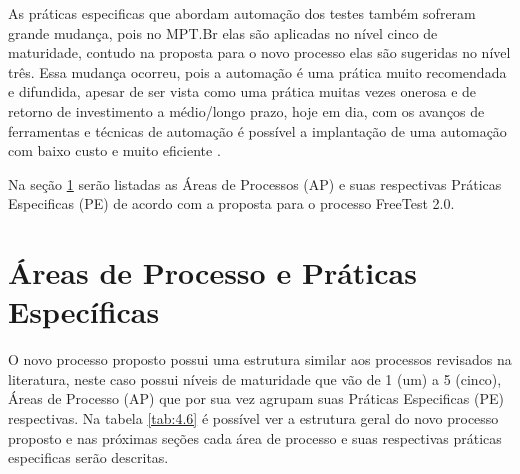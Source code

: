 As práticas especificas que abordam automação dos testes também sofreram grande mudança, pois no MPT.Br elas são aplicadas no nível cinco de maturidade, contudo na proposta para o novo processo elas são sugeridas no nível três. Essa mudança ocorreu, pois a automação é uma prática muito recomendada e difundida, apesar de ser vista como uma prática muitas vezes onerosa e de retorno de investimento a médio/longo prazo, hoje em dia, com os avanços de ferramentas e técnicas de automação é possível a implantação de uma automação com baixo custo e muito eficiente \cite{BRAGA2015}.

Na seção \ref{sec:areasdeprocessoepraticas} serão listadas as Áreas de Processos (AP) e suas respectivas Práticas Especificas (PE) de acordo com a proposta para o processo FreeTest 2.0.

\section{Áreas de Processo e Práticas Específicas}
\label{sec:areasdeprocessoepraticas}

O novo processo proposto possui uma estrutura similar aos processos revisados na literatura, neste caso possui níveis de maturidade que vão de 1 (um) a 5 (cinco), Áreas de Processo (AP) que por sua vez agrupam suas Práticas Especificas (PE) respectivas. Na tabela \ref{tab:4.6} é possível ver a estrutura geral do novo processo proposto e nas próximas seções cada área de processo e suas respectivas práticas especificas serão descritas.

